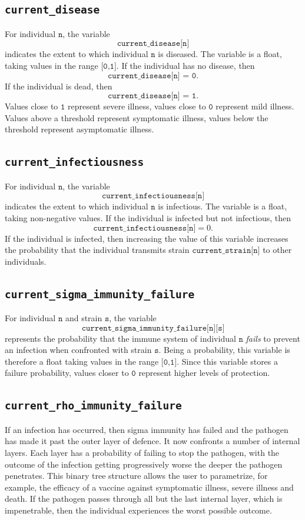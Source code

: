 \documentclass[10pt,letterpaper]{article}
\begin{document}
\subsection*{\texttt{current{\_}disease}}
For individual $\texttt{n}$, the variable $$\texttt{current{\_}disease[n]}$$ indicates the extent to which individual $\texttt{n}$ is diseased. The variable is a float, taking values in the range $\texttt{[0,1]}.$ If the individual has no disease, then $$\texttt{current{\_}disease[n] = 0}.$$ If the individual is dead, then $$\texttt{current{\_}disease[n] = 1}.$$ Values close to $\texttt{1}$ represent severe illness, values close to $\texttt{0}$ represent mild illness. Values above a threshold represent symptomatic illness, values below the threshold represent asymptomatic illness. 

\subsection*{\texttt{current{\_}infectiousness}}
For individual $\texttt{n}$, the variable $$\texttt{current{\_}infectiousness[n]}$$ indicates the extent to which individual $\texttt{n}$ is infectious. The variable is a float, taking non-negative values. If the individual is infected but not infectious, then $$\texttt{current{\_}infectiousness[n]} = 0.$$ If the individual is infected, then increasing the value of this variable increases the probability that the individual transmits strain $\texttt{current{\_}strain[n]}$ to other individuals.

\subsection*{\texttt{current{\_}sigma{\_}immunity{\_}failure}}
For individual $\texttt{n}$ and strain $\texttt{s}$, the variable $$\texttt{current{\_}sigma{\_}immunity{\_}failure[n][s]}$$ represents the probability that the immune system of individual $\texttt{n}$ \textit{fails} to prevent an infection when confronted with strain $\texttt{s}$. Being a probability, this variable is therefore a float taking values in the range $\texttt{[0,1]}.$ Since this variable stores a failure probability, values closer to $\texttt{0}$ represent higher levels of protection.

\subsection*{\texttt{current{\_}rho{\_}immunity{\_}failure}}
If an infection has occurred, then sigma immunity has failed and the pathogen has made it past the outer layer of defence. It now confronts a number of internal layers. Each layer has a probability of failing to stop the pathogen, with the outcome of the infection getting progressively worse the deeper the pathogen penetrates. This binary tree structure allows the user to parametrize, for example, the efficacy of a vaccine against symptomatic illness, severe illness and death. If the pathogen passes through all but the last internal layer, which is impenetrable, then the individual experiences the worst possible outcome.
\end{document}
